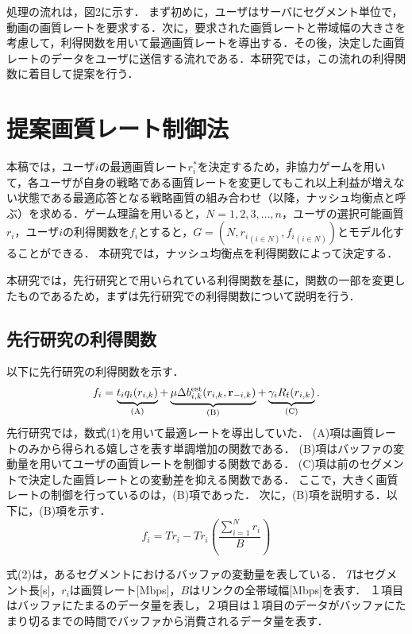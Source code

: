 \documentclass[rinkou,a4paper,uplatex]{ieicej}
\begin{document}
処理の流れは，図2に示す\cite{motomoto}．
まず初めに，ユーザはサーバにセグメント単位で，動画の画質レートを要求する．次に，要求された画質レートと帯域幅の大きさを考慮して，利得関数を用いて最適画質レートを導出する．その後，決定した画質レートのデータをユーザに送信する流れである．本研究では，この流れの利得関数に着目して提案を行う．

\section{提案画質レート制御法}

本稿では，ユーザ$i$の最適画質レート$r_i^*$を決定するため，非協力ゲームを用いて，各ユーザが自身の戦略である画質レートを変更してもこれ以上利益が増えない状態である最適応答となる戦略画質の組み合わせ（以降，ナッシュ均衡点と呼ぶ）を求める．ゲーム理論を用いると，$N=${$1,2,3,\dots,n$}，ユーザの選択可能画質$r_i$，ユーザ$i$の利得関数を$f_i$とすると，$G=\left(N,{r_i}_{(i\in N)},{f_i}_{(i\in N)}\right)$とモデル化することができる．
本研究では，ナッシュ均衡点を利得関数によって決定する．

本研究では，先行研究\cite{kison}と\cite{motomoto}で用いられている利得関数を基に，関数の一部を変更したものであるため，まずは先行研究での利得関数について説明を行う．

\subsection{先行研究の利得関数}
以下に先行研究の利得関数を示す．
\begin{equation}
 f_{i}=\underbrace{t_{i}q_{i}(r_{i,k})}_{(\rm{A})}+\underbrace{\mu\Delta{b^{\rm{est}}_{i,k}}(r_{i,k},\mathbf{r}_{-i,k})}_{(\rm{B})}+\underbrace{\gamma_i{R}_{\rm{f}}(r_{i,k})}_{(\rm{C})}.
\end{equation}
先行研究では，数式(1)を用いて最適レートを導出していた．
(A)項は画質レートのみから得られる嬉しさを表す単調増加の関数である．
(B)項はバッファの変動量を用いてユーザの画質レートを制御する関数である．
(C)項は前のセグメントで決定した画質レートとの変動差を抑える関数である．
ここで，大きく画質レートの制御を行っているのは，(B)項であった．
次に，(B)項を説明する．以下に，(B)項を示す．
\begin{equation}
 f_i=Tr_i-Tr_i(\frac{\sum^N_{i=1}r_i}{B})
\end{equation}

式(2)は，あるセグメントにおけるバッファの変動量を表している．
$T$はセグメント長[s]，$r_i$は画質レート[Mbps]，$B$はリンクの全帯域幅[Mbps]を表す．
１項目はバッファにたまるのデータ量を表し，２項目は１項目のデータがバッファにたまり切るまでの時間でバッファから消費されるデータ量を表す．
\end{document}
